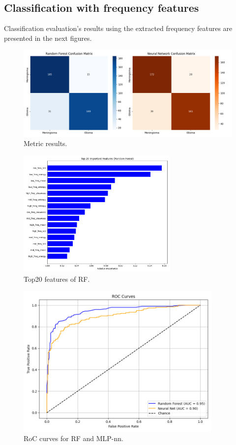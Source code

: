\documentclass[11pt,a4paper]{article}
\begin{document}
	\subsection{Classification with frequency features}
		

		Classification evaluation's results using the extracted frequency features are presented in the 
		next figures.

		\begin{figure}[h]
			\centering
			\includegraphics[width=1.1\textwidth]{images/freq_metrics.png}
			\caption{Metric results.}
			\label{fig1:}
		\end{figure}		

		\begin{figure}[h]
			\centering
			\includegraphics[width=0.7\textwidth]{images/freq_top_rf.png}
			\caption{Top20 features of RF.}
			\label{fig1:}
		\end{figure}		

		\begin{figure}[H]
			\centering
			\includegraphics[width=0.9\textwidth]{images/freq_roc.png}
			\caption{RoC curves for RF and MLP-nn.}
			\label{fig1:}
		\end{figure}		
\end{document}
